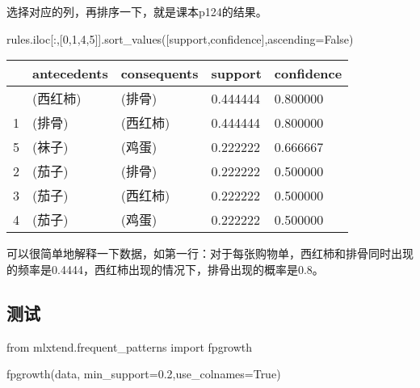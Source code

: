\documentclass[
  letterpaper,
  DIV=11,
  numbers=noendperiod]{scrreprt}
\newenvironment{Shaded}{\begin{snugshade}}{\end{snugshade}}
\newcommand{\DecValTok}[1]{\textcolor[rgb]{0.68,0.00,0.00}{#1}}
\newcommand{\FloatTok}[1]{\textcolor[rgb]{0.68,0.00,0.00}{#1}}
\newcommand{\ImportTok}[1]{\textcolor[rgb]{0.00,0.46,0.62}{#1}}
\newcommand{\NormalTok}[1]{\textcolor[rgb]{0.00,0.23,0.31}{#1}}
\newcommand{\OperatorTok}[1]{\textcolor[rgb]{0.37,0.37,0.37}{#1}}
\newcommand{\StringTok}[1]{\textcolor[rgb]{0.13,0.47,0.30}{#1}}
\newcommand{\VariableTok}[1]{\textcolor[rgb]{0.07,0.07,0.07}{#1}}
\begin{document}
选择对应的列，再排序一下，就是课本p124的结果。

\begin{Shaded}
\begin{Highlighting}[]
\NormalTok{rules.iloc[:,[}\DecValTok{0}\NormalTok{,}\DecValTok{1}\NormalTok{,}\DecValTok{4}\NormalTok{,}\DecValTok{5}\NormalTok{]].sort\_values([}\StringTok{\textquotesingle{}support\textquotesingle{}}\NormalTok{,}\StringTok{\textquotesingle{}confidence\textquotesingle{}}\NormalTok{],ascending}\OperatorTok{=}\VariableTok{False}\NormalTok{)}
\end{Highlighting}
\end{Shaded}

\begin{longtable}[]{@{}lllll@{}}
\toprule\noalign{}
& antecedents & consequents & support & confidence \\
\midrule\noalign{}
\endhead
\bottomrule\noalign{}
\endlastfoot
0 & (西红柿) & (排骨) & 0.444444 & 0.800000 \\
1 & (排骨) & (西红柿) & 0.444444 & 0.800000 \\
5 & (袜子) & (鸡蛋) & 0.222222 & 0.666667 \\
2 & (茄子) & (排骨) & 0.222222 & 0.500000 \\
3 & (茄子) & (西红柿) & 0.222222 & 0.500000 \\
4 & (茄子) & (鸡蛋) & 0.222222 & 0.500000 \\
\end{longtable}

可以很简单地解释一下数据，如第一行：对于每张购物单，西红柿和排骨同时出现的频率是0.4444，西红柿出现的情况下，排骨出现的概率是0.8。

\hypertarget{ux6d4bux8bd5}{%
\subsection{测试}\label{ux6d4bux8bd5}}

\begin{Shaded}
\begin{Highlighting}[]
\ImportTok{from}\NormalTok{ mlxtend.frequent\_patterns }\ImportTok{import}\NormalTok{ fpgrowth}

\NormalTok{fpgrowth(data, min\_support}\OperatorTok{=}\FloatTok{0.2}\NormalTok{,use\_colnames}\OperatorTok{=}\VariableTok{True}\NormalTok{)}
\end{Highlighting}
\end{Shaded}
\end{document}
